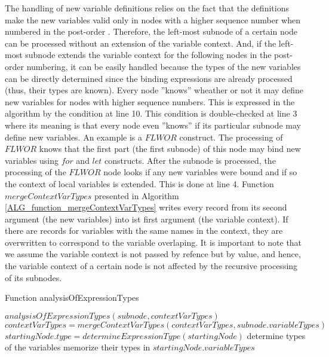 The handling of new variable definitions relies on the fact that the definitions make the new variables valid only in nodes with a higher sequence number when numbered in the post-order . Therefore, the left-most subnode of a certain node can be processed without an extension of the variable context. And, if the left-most subnode extends the variable context for the following nodes in the post-order numbering, it can be easily handled because the types of the new variables can be directly determined since the binding expressions are already processed (thus, their types are known). Every node ''knows'' wheather or not it may define new variables for nodes with higher sequence numbers. This is expressed in the algorithm by the condition at line 10. This condition is double-checked at line 3 where its meaning is that every node even ''knows'' if its particular subnode may define new variables. An example is a $FLWOR$ construct. The processing of $FLWOR$ knows that the first part (the first subnode) of this node may bind new variables using $for$ and $let$ constructs. After the subnode is processed, the processing of the $FLWOR$ node looks if any new variables were bound and if so the context of local variables is extended. This is done at line 4. Function $mergeContextVarTypes$ presented in Algorithm \ref{ALG_function_mergeContextVarTypes} writes every record from its second argument (the new variables) into ist first argument (the variable context). If there are records for variables with the same names in the context, they are overwritten to correspond to the variable overlaping. It is important to note that we assume the variable context is not passed by refence but by value, and hence, the variable context of a certain node is not affected by the recursive processing of its subnodes.

\begin{algorithm}
\caption{Function analysisOfExpressionTypes}
\label{ALG_func_analysisOfExpressionTypes}
\begin{algorithmic}[1]

    \STATE $analysisOfExpressionTypes(subnode, contextVarTypes)$ 
        \STATE $contextVarTypes = mergeContextVarTypes(contextVarTypes, subnode.variableTypes)$
    \ENDIF
\ENDFOR
{}
    \STATE $startingNode.type = determineExpressionType(startingNode)$
\ENDIF
{}
    \STATE determine types of the variables
    \STATE memorize their types in $startingNode.variableTypes$
\ENDIF
\end{algorithmic}
\end{algorithm}

